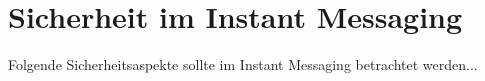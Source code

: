\section{Sicherheit im Instant Messaging}
Folgende Sicherheitsaspekte sollte im Instant Messaging betrachtet werden...